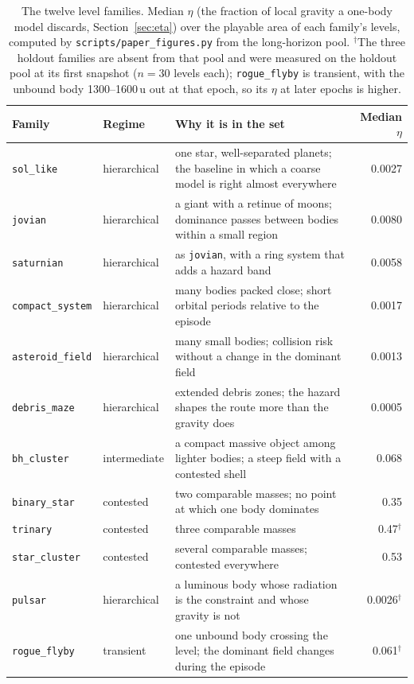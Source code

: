 \documentclass[11pt]{article}
\newcommand{\code}[1]{\texttt{\small #1}}
\begin{document}
\begin{table}[t]
\centering
\footnotesize
\begin{tabular}{llp{4.8cm}r}
\toprule
Family & Regime & Why it is in the set & Median $\eta$ \\
\midrule
\code{sol\_like}        & hierarchical & one star, well-separated planets; the baseline in which a coarse model is right almost everywhere & 0.0027 \\
\code{jovian}           & hierarchical & a giant with a retinue of moons; dominance passes between bodies within a small region & 0.0080 \\
\code{saturnian}        & hierarchical & as \code{jovian}, with a ring system that adds a hazard band & 0.0058 \\
\code{compact\_system}  & hierarchical & many bodies packed close; short orbital periods relative to the episode & 0.0017 \\
\code{asteroid\_field}  & hierarchical & many small bodies; collision risk without a change in the dominant field & 0.0013 \\
\code{debris\_maze}     & hierarchical & extended debris zones; the hazard shapes the route more than the gravity does & 0.0005 \\
\code{bh\_cluster}      & intermediate & a compact massive object among lighter bodies; a steep field with a contested shell & 0.068 \\
\code{binary\_star}     & contested & two comparable masses; no point at which one body dominates & 0.35 \\
\code{trinary}          & contested & three comparable masses & 0.47$^{\dagger}$ \\
\code{star\_cluster}    & contested & several comparable masses; contested everywhere & 0.53 \\
\code{pulsar}           & hierarchical & a luminous body whose radiation is the constraint and whose gravity is not & 0.0026$^{\dagger}$ \\
\code{rogue\_flyby}     & transient & one unbound body crossing the level; the dominant field changes during the episode & 0.061$^{\dagger}$ \\
\bottomrule
\end{tabular}
\caption{The twelve level families. Median $\eta$ (the fraction of local
gravity a one-body model discards, Section~\ref{sec:eta}) over the playable
area of each family's levels, computed by \code{scripts/paper\_figures.py}
from the long-horizon pool. $^{\dagger}$The three holdout families are
absent from that pool and were measured on the holdout pool at its first
snapshot ($n = 30$ levels each); \code{rogue\_flyby} is transient, with the
unbound body 1300--1600\,u out at that epoch, so its $\eta$ at later epochs
is higher.}
\label{tab:families}
\end{table}
\end{document}
